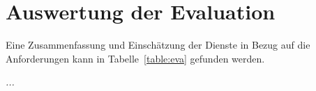 \section{Auswertung der Evaluation} \label{sec:konzeption:evaAuswertung}
Eine Zusammenfassung und Einschätzung der Dienste in Bezug auf die Anforderungen kann in Tabelle~\ref{table:eva} gefunden werden.



\textit{...}

